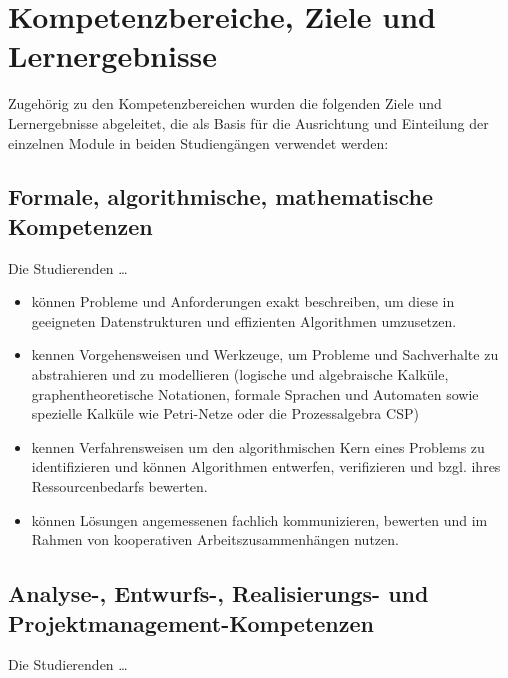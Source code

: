 \section{Kompetenzbereiche, Ziele und
Lernergebnisse}\label{kompetenzbereiche-ziele-und-lernergebnisse}

Zugehörig zu den Kompetenzbereichen wurden die folgenden Ziele und
Lernergebnisse abgeleitet, die als Basis für die Ausrichtung und
Einteilung der einzelnen Module in beiden Studiengängen verwendet
werden:

\subsection{Formale, algorithmische, mathematische
Kompetenzen}\label{formale-algorithmische-mathematische-kompetenzen}

Die Studierenden \ldots{}

\begin{itemize}
\tightlist
\item
  können Probleme und Anforderungen exakt beschreiben, um diese in
  geeigneten Datenstrukturen und effizienten Algorithmen umzusetzen.
\item
  kennen Vorgehensweisen und Werkzeuge, um Probleme und Sachverhalte zu
  abstrahieren und zu modellieren (logische und algebraische Kalküle,
  graphentheoretische Notationen, formale Sprachen und Automaten sowie
  spezielle Kalküle wie Petri-Netze oder die Prozessalgebra CSP)
\item
  kennen Verfahrensweisen um den algorithmischen Kern eines Problems zu
  identifizieren und können Algorithmen entwerfen, verifizieren und
  bzgl. ihres Ressourcenbedarfs bewerten.
\item
  können Lösungen angemessenen fachlich kommunizieren, bewerten und im
  Rahmen von kooperativen Arbeitszusammenhängen nutzen.
\end{itemize}

\subsection{Analyse-, Entwurfs-, Realisierungs- und
Projektmanagement-Kompetenzen}\label{analyse--entwurfs--realisierungs--und-projektmanagement-kompetenzen}

Die Studierenden \ldots{}


